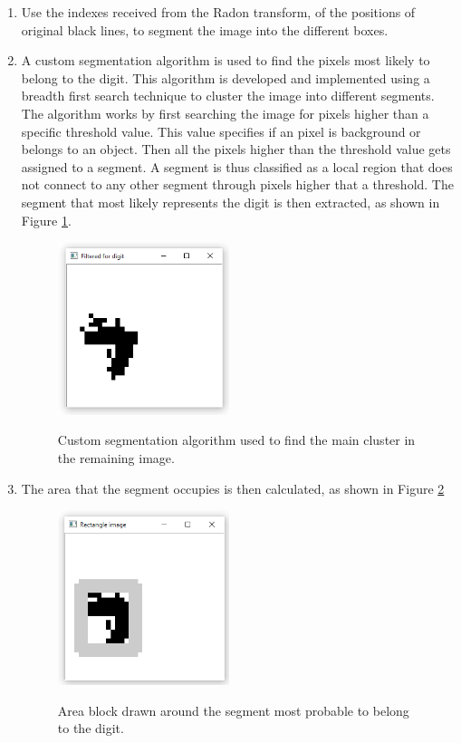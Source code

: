\begin{enumerate}
\item Use the indexes received from the Radon transform, of the positions of original black lines, to segment the image into the different boxes.
\item A custom segmentation algorithm is used to find the pixels most likely to belong to the digit. This algorithm is developed and implemented using a breadth first search technique to cluster the image into different segments. The algorithm works by first searching the image for pixels higher than a specific threshold value. This value specifies if an pixel is background or belongs to an object. Then all the pixels higher than the threshold value gets assigned to a segment. A segment is thus classified as a local region that does not connect to any other segment through pixels higher that a threshold. The segment that most likely represents the digit is then extracted, as shown in Figure \ref{fig:c}.
\begin{figure}
  \centering
  \includegraphics[width=5cm]{Cluster}\\
  \caption{Custom segmentation algorithm used to find the main cluster in the remaining image.}
  \label{fig:c}
\end{figure}

\item The area that the segment occupies is then calculated, as shown in Figure \ref{fig:areaLoc}

\begin{figure}
  \centering
  \includegraphics[width=5cm]{DetectArea}\\
  \caption{Area block drawn around the segment most probable to belong to the digit.}
  \label{fig:areaLoc}
\end{figure}


\end{enumerate}
